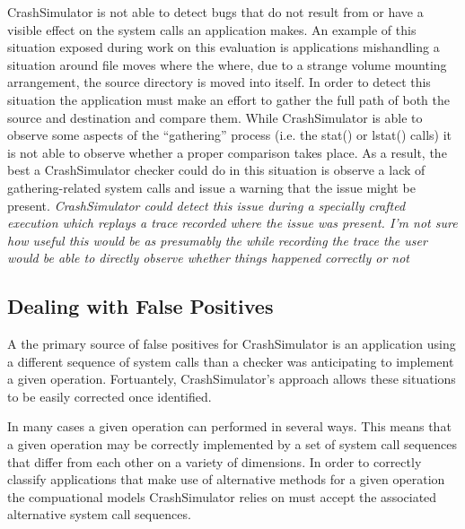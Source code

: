     CrashSimulator is not able to detect bugs that do not result from or have a visible effect on the system calls
    an application makes.  An example of this situation exposed during work on this evaluation is applications
    mishandling a situation around file moves where the where, due to a strange volume mounting arrangement, the
    source directory is moved into itself.  In order to detect this situation the application must make an effort to
    gather the full path of both the source and destination and compare them.  While CrashSimulator is able to
    observe some aspects of the ``gathering'' process (i.e. the stat() or lstat() calls) it is not able to observe
    whether a proper comparison takes place.  As a result, the best a CrashSimulator checker could do in this
    situation is observe a lack of gathering-related system calls and issue a warning that the issue might be
    present.  \emph{CrashSimulator could detect this issue during a specially crafted execution which replays a
        trace recorded where the issue was present.  I'm not sure how useful this would be as presumably the while
        recording the trace the user would be able to directly observe whether things happened correctly or not}
        
    \subsection{Dealing with False Positives}

    A the primary source of false positives for CrashSimulator is an application using a different sequence of system
    calls than a checker was anticipating to implement a given operation.  Fortuantely, CrashSimulator's approach allows
    these situations to be easily corrected once identified.

    In many cases a given operation can performed in several ways.  This means that a given operation may be correctly
    implemented by a set of system call sequences that differ from each other on a variety of dimensions.  In order to
    correctly classify applications that make use of alternative methods for a given operation the compuational models
    CrashSimulator relies on must accept the associated alternative system call sequences.

